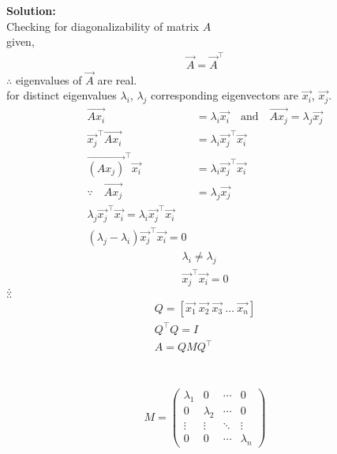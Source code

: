 \documentclass[journal]{IEEEtran}
\begin{document}
\textbf{Solution:}\\
Checking for diagonalizability of matrix $A$ \\
given,
\begin{align}
\vec{A} = \vec{A}^\top
\end{align}
$\therefore$ eigenvalues of $\vec{A}$ are real.\\
for distinct eigenvalues $\lambda_i$, $\lambda_j$ corresponding eigenvectors are $\vec{x_i}$, $\vec{x_j}$.
\begin{align}
\vec{Ax_i} &= \lambda_i \vec{x_i} \quad \text{and} \quad \vec{Ax_j} = \lambda_j \vec{x_j} 
\\\vec{x_j}^\top \vec{A x_i} &= \lambda_i \vec{x_j}^\top \vec{x_i} \\
\vec{(Ax_j)}^\top \vec{x_i} &= \lambda_i \vec{x_j}^\top \vec{x_i}\\
\because \quad \vec{Ax_j} &= \lambda_j \vec{x_j}\\
\lambda_j \vec{x_j}^\top \vec{x_i} = \lambda_i \vec{x_j}^\top \vec{x_i}\\
(\lambda_j - \lambda_i) \vec{x_j}^\top \vec{x_i} = 0
\end{align}
\begin{align}
\lambda_i \neq \lambda_j \\
\vec{x_j}^\top\vec{x_i}=0
\end{align}
$\therefore$ \\
$\therefore$ \\
\begin{align}
Q = [\vec{x_1} \ \vec{x_2} \ \vec{x_3} \ \dots \ \vec{x_n}] \\
Q^\top Q = I\\
A = Q MQ^\top
\end{align}
\\
\\
\begin{align}
M = 
\begin{pmatrix}
\lambda_{1} & 0 & \cdots & 0 \\
0 & \lambda_{2} & \cdots & 0 \\
\vdots & \vdots & \ddots & \vdots \\
0 & 0 & \cdots & \lambda_{n}
\end{pmatrix}
\end{align}
\end{document}
